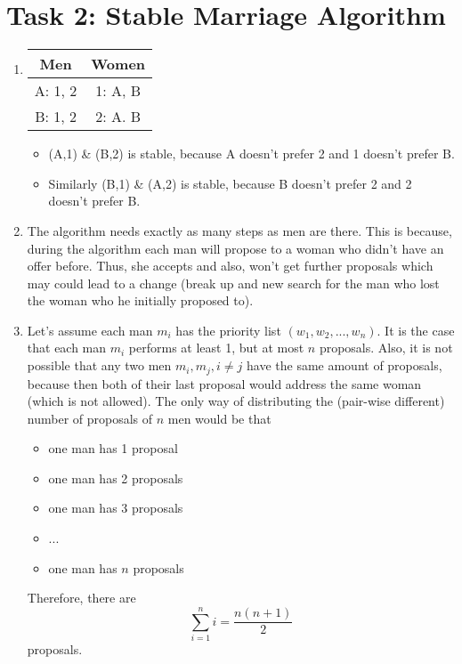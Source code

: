 \documentclass{scrartcl}
\begin{document}
	\section*{Task 2: Stable Marriage Algorithm}
	\begin{enumerate}
		\item\phantom{phantom}
		\begin{center}
			\begin{tabular}{c|c}
				Men & Women\\
				\hline
				A: 1, 2 & 1: A, B\\
				B: 1, 2 & 2: A. B
			\end{tabular}
		\end{center}
		\begin{itemize}
			\item (A,1) \& (B,2) is stable, because A doesn't prefer 2 and 1 doesn't prefer B.
			\item Similarly (B,1) \& (A,2) is stable, because B doesn't prefer 2 and 2 doesn't prefer B.
		\end{itemize}
		
		\item The algorithm needs exactly as many steps as men are there.
		This is because, during the algorithm each man will propose to a woman who didn't have an offer before.
		Thus, she accepts and also, won't get further proposals which may could lead to a change (break up and new search for the man who lost the woman who he initially proposed to).
		
		\item Let's assume each man $m_i$ has the priority list $(w_1, w_2, ..., w_n)$.
		It is the case that each man $m_i$ performs at least 1, but at most $n$ proposals.
		Also, it is not possible that any two men $m_i, m_j, i\neq j$ have the same amount of proposals, because then both of their last proposal would address the same woman (which is not allowed).
		The only way of distributing the (pair-wise different) number of proposals of $n$ men would be that
		\begin{itemize}
			\item one man has 1 proposal
			\item one man has 2 proposals
			\item one man has 3 proposals
			\item ...
			\item one man has $n$ proposals
		\end{itemize}
		Therefore, there are
		\[\sum_{i=1}^ni=\frac{n(n+1)}{2}\]
		proposals.
		

\end{enumerate}
\end{document}
